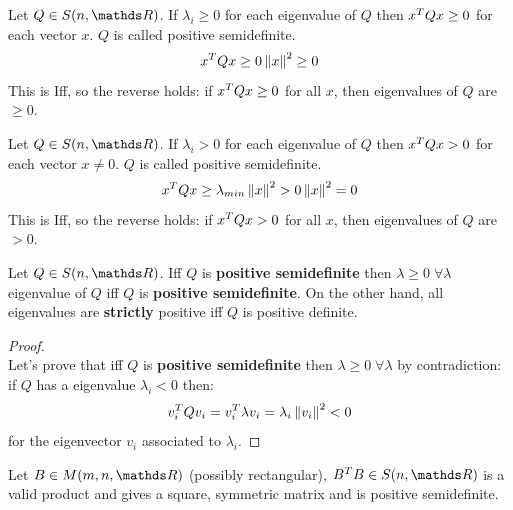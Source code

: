 \documentclass[ComputationalMathematics.tex]{subfiles}
\begin{document}
\begin{definition}
  Let $Q \in S(n, \R)$. If $\lambda_i \geq 0$ for each eigenvalue of $Q$ then ${x}^{T} Q x \ge 0$ for each vector $x$. $Q$ is called positive semidefinite.
  $$ {x}^{T} Q x \ge 0\left\lVert x\right\rVert^2 \geq 0$$
  This is Iff, so the reverse holds: if ${x}^{T} Q x \ge 0$ for all $x$, then eigenvalues of $Q$ are $\geq 0$.
  \end{definition}

\begin{definition}
    Let $Q \in S(n, \R)$. If $\lambda_i > 0$ for each eigenvalue of $Q$ then ${x}^{T} Q x > 0$ for each vector $x \neq 0$. $Q$ is called positive semidefinite.
    $$ {x}^{T} Q x \ge \lambda_{min}\left\lVert x\right\rVert^2 > 0\left\lVert x\right\rVert^2 = 0$$
    This is Iff, so the reverse holds: if ${x}^{T} Q x > 0$ for all $x$, then eigenvalues of $Q$ are $> 0$.

\end{definition}

\begin{proposition}
  Let $Q \in S(n, \R)$. Iff $Q$ is \textbf{positive semidefinite} then $\lambda \ge 0 \; \forall \lambda$ eigenvalue of $Q$ iff $Q$ is \textbf{positive semidefinite}. On the other hand, all eigenvalues are \textbf{strictly} positive iff $Q$ is positive definite.
\end{proposition}

\begin{proof}~\\
Let's prove that iff $Q$ is \textbf{positive semidefinite} then $\lambda \ge 0 \; \forall \lambda$ by contradiction:\\
if $Q$ has a eigenvalue $\lambda_i < 0$ then:
$$ v_i^TQv_i = v_i^T \lambda v_i = \lambda_i\left\lVert v_i\right\rVert^2 < 0$$
for the eigenvector $v_i$ associated to $\lambda_i$.
  

\end{proof}

\begin{proposition}
  Let $B \in M(m, n, \R)$ (possibly rectangular), $\tr{B} B \in S(n, \R)$ is a valid product
and gives a square, symmetric matrix and is positive semidefinite.
\end{proposition}
\end{document}

